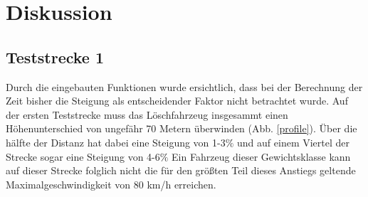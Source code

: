 \section{Diskussion}

\subsection{Teststrecke 1}

Durch die eingebauten Funktionen wurde ersichtlich, dass bei der Berechnung der Zeit bisher die Steigung als entscheidender Faktor nicht betrachtet wurde. Auf der ersten Teststrecke muss das Löschfahrzeug insgesammt einen Höhenunterschied von ungefähr 70 Metern überwinden (Abb. \ref{profile}). Über die hälfte der Distanz hat dabei eine Steigung von 1-3$\%$ und auf einem Viertel der Strecke sogar eine Steigung von 4-6$\%$ Ein Fahrzeug dieser Gewichtsklasse kann auf dieser Strecke folglich nicht die für den größten Teil dieses Anstiegs geltende Maximalgeschwindigkeit von 80 km/h erreichen.


